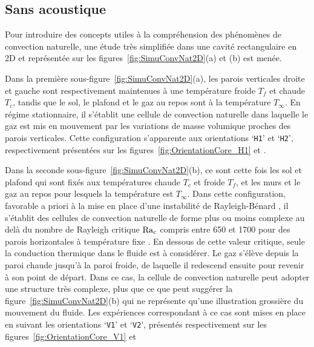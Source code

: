 \subsection{Sans acoustique}
Pour introduire des concepts utiles à la compréhension des phénomènes de convection naturelle, une étude très simplifiée dans une cavité rectangulaire en 2D et représentée sur les figures~\ref{fig:SimuConvNat2D}{\color{MatlabOrange}(a)} et {\color{MatlabOrange}(b)} est menée. 

Dans la première sous-figure~\ref{fig:SimuConvNat2D}{\color{MatlabOrange}(a)}, les parois verticales droite et gauche sont respectivement maintenues à une température froide $T_f$ et chaude $T_c$, tandis que le sol, le plafond et le gaz au repos sont à la température $T_\infty$. En régime stationnaire, il s'établit une cellule de convection naturelle dans laquelle le gaz est mis en mouvement par les  variations de masse volumique proches des parois verticales. Cette configuration s'apparente aux orientations `\texttt{H1}' et `\texttt{H2}', respectivement présentées sur les figures~\ref{fig:OrientationCore_H1} et .

Dans la seconde sous-figure~\ref{fig:SimuConvNat2D}{\color{MatlabOrange}(b)}, ce sont cette fois les sol et plafond qui sont fixés aux températures chaude $T_c$ et froide $T_f$, et les murs et le gaz au repos pour lesquels la température est $T_\infty$. Dans cette configuration, favorable a priori à la mise en place d'une instabilité de \og Rayleigh-Bénard \fg{}, il s'établit des cellules de convection naturelle de forme plus ou moins complexe au delà du nombre de Rayleigh critique $\mathrm{Ra}_c$ compris entre 650 et 1700 pour des parois horizontales à température fixe \cite{getling_rayleigh-benard_1998}. En dessous de cette valeur critique, seule la conduction thermique dans le fluide est à considérer. Le gaz s'élève depuis la paroi chaude jusqu'à la paroi froide, de laquelle il redescend ensuite pour revenir à son point de départ. Dans ce cas, la cellule de convection naturelle peut adopter une structure très complexe, plus que ce que peut suggérer la figure~\ref{fig:SimuConvNat2D}{\color{MatlabOrange}(b)} qui ne représente qu'une illustration grossière du mouvement du fluide. Les expériences correspondant à ce cas sont mises en place en suivant les orientations `\texttt{V1}' et `\texttt{V2}', présentés respectivement sur les figures~\ref{fig:OrientationCore_V1} et 

